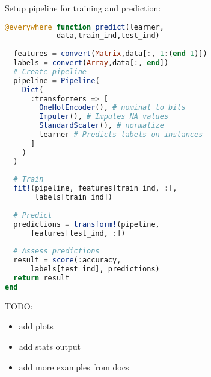 \documentclass{juliacon}
\begin{document}
Setup pipeline for training and prediction:
\begin{lstlisting}[language = Julia]
@everywhere function predict(learner,
            data,train_ind,test_ind)
            
  features = convert(Matrix,data[:, 1:(end-1)])
  labels = convert(Array,data[:, end])
  # Create pipeline
  pipeline = Pipeline(
    Dict(
      :transformers => [
        OneHotEncoder(), # nominal to bits
        Imputer(), # Imputes NA values
        StandardScaler(), # normalize
        learner # Predicts labels on instances
      ]
    )
  )
  
  # Train
  fit!(pipeline, features[train_ind, :],
       labels[train_ind])
       
  # Predict
  predictions = transform!(pipeline, 
      features[test_ind, :])
  
  # Assess predictions
  result = score(:accuracy, 
      labels[test_ind], predictions)
  return result
end
\end{lstlisting}


TODO: 
\begin{itemize}
\item add plots
\item add stats output
\item add more examples from docs
\end{itemize}
%
%

%
\end{document}
